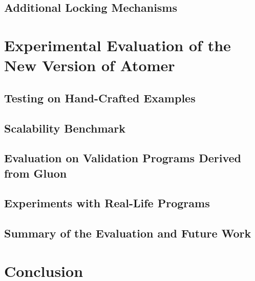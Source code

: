 \section{Additional Locking Mechanisms}
\label{sec:implementLocks}






\chapter{Experimental Evaluation of the New Version of Atomer}
\label{chap:exp}

\cite{deadlockKroening}


\section{Testing on Hand-Crafted Examples}
\label{sec:expHand}


\section{Scalability Benchmark}
\label{sec:expScal}


\section{Evaluation on Validation Programs Derived from Gluon}
\label{sec:expGluon}


\section{Experiments with Real-Life Programs}
\label{sec:expReal}


\section{Summary of the Evaluation and Future Work}
\label{sec:expSummary}






\chapter{Conclusion}
\label{chap:conc}

